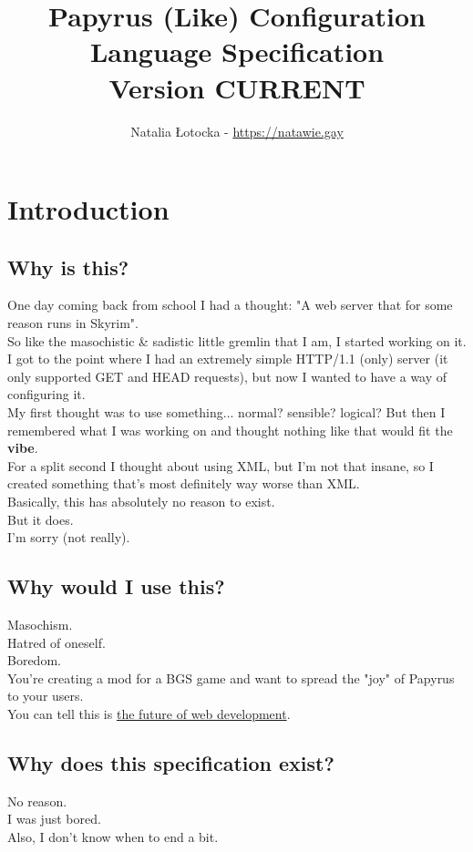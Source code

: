 \documentclass[12pt]{article}
\title{%
    Papyrus (Like) Configuration Language Specification \\
    \large Version CURRENT
}
\author{\foreignlanguage{polish}{Natalia Łotocka} - \url{https://natawie.gay}}
\begin{document}
    \maketitle
    \tableofcontents
    \newpage

    \section{Introduction}
    \subsection{Why is this?}
    One day coming back from school I had a thought: "A web server that for some reason runs in Skyrim". \\
    So like the masochistic \& sadistic little gremlin that I am, I started working on it. \\
    I got to the point where I had an extremely simple HTTP/1.1 (only) server (it only supported GET and HEAD requests), but now I wanted to have a way of configuring it. \\
    My first thought was to use something... normal? sensible? logical? But then I remembered what I was working on and thought nothing like that would fit the \textbf{vibe}. \\
    For a split second I thought about using XML, but I'm not that insane, so I created something that's most definitely way worse than XML. \\
    Basically, this has absolutely no reason to exist. \\
    But it does. \\
    I'm sorry (not really).

    \subsection{Why would I use this?}
    Masochism. \\
    Hatred of oneself. \\
    Boredom. \\
    You're creating a mod for a BGS game and want to spread the "joy" of Papyrus to your users. \\
    You can tell this is \href{https://github.com/natawie/PapyrusLikeConfigurationLanguageToHTML}{the future of web development}.

    \subsection{Why does this specification exist?}
    No reason. \\
    I was just bored. \\
    Also, I don't know when to end a bit.
\end{document}
